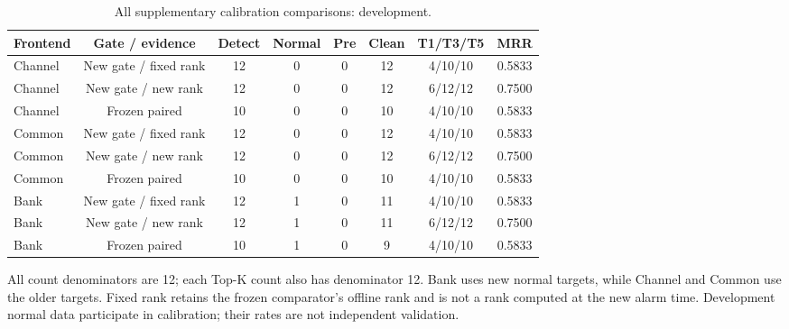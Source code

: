\begin{table}[htbp]
\centering\footnotesize
\caption{All supplementary calibration comparisons: development.}
\label{tab:s_development}
\renewcommand{\arraystretch}{1.15}
\setlength{\tabcolsep}{4pt}
\begin{tabular}{lccccccc}
\toprule
Frontend & Gate / evidence & Detect & Normal & Pre & Clean & T1/T3/T5 & MRR\\
\midrule
Channel & New gate / fixed rank & 12 & 0 & 0 & 12 & 4/10/10 & 0.5833\\
Channel & New gate / new rank & 12 & 0 & 0 & 12 & 6/12/12 & 0.7500\\
Channel & Frozen paired & 10 & 0 & 0 & 10 & 4/10/10 & 0.5833\\
Common & New gate / fixed rank & 12 & 0 & 0 & 12 & 4/10/10 & 0.5833\\
Common & New gate / new rank & 12 & 0 & 0 & 12 & 6/12/12 & 0.7500\\
Common & Frozen paired & 10 & 0 & 0 & 10 & 4/10/10 & 0.5833\\
Bank & New gate / fixed rank & 12 & 1 & 0 & 11 & 4/10/10 & 0.5833\\
Bank & New gate / new rank & 12 & 1 & 0 & 11 & 6/12/12 & 0.7500\\
Bank & Frozen paired & 10 & 1 & 0 & 9 & 4/10/10 & 0.5833\\
\bottomrule
\end{tabular}
\par\smallskip\parbox{0.98\linewidth}{\scriptsize All count denominators are 12; each Top-K count also has denominator 12. Bank uses new normal targets, while Channel and Common use the older targets. Fixed rank retains the frozen comparator's offline rank and is not a rank computed at the new alarm time. Development normal data participate in calibration; their rates are not independent validation.}
\end{table}
